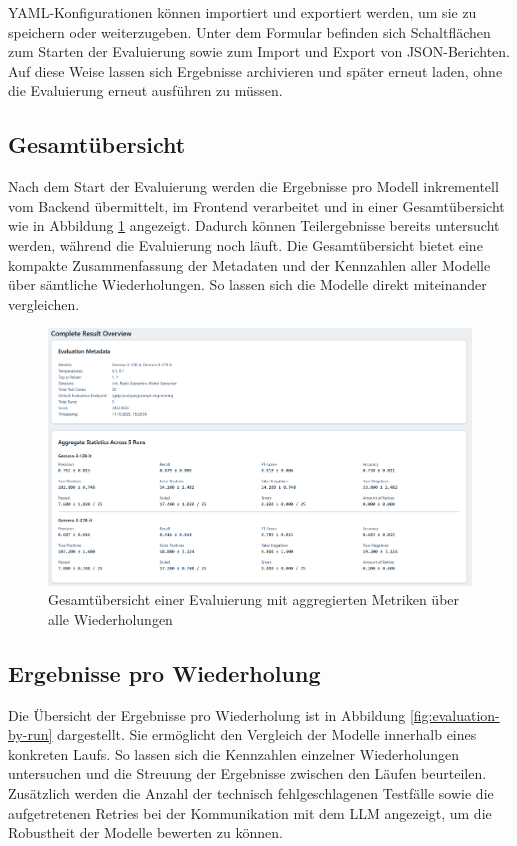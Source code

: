 YAML-Konfigurationen können importiert und exportiert werden, um sie zu speichern oder weiterzugeben. Unter dem Formular befinden sich Schaltflächen zum Starten der Evaluierung sowie zum Import und Export von JSON-Berichten. Auf diese Weise lassen sich Ergebnisse archivieren und später erneut laden, ohne die Evaluierung erneut ausführen zu müssen.

\subsection*{Gesamtübersicht}

Nach dem Start der Evaluierung werden die Ergebnisse pro Modell inkrementell vom Backend übermittelt, im Frontend verarbeitet und in einer Gesamtübersicht wie in Abbildung \ref{fig:evaluation-overview} angezeigt. Dadurch können Teilergebnisse bereits untersucht werden, während die Evaluierung noch läuft. Die Gesamtübersicht bietet eine kompakte Zusammenfassung der Metadaten und der Kennzahlen aller Modelle über sämtliche Wiederholungen. So lassen sich die Modelle direkt miteinander vergleichen.

\begin{figure}[h]
    \centering
    \includegraphics[width=\textwidth]{images/evaluation/evaluation-result-overview_new}
    \caption{Gesamtübersicht einer Evaluierung mit aggregierten Metriken über alle Wiederholungen}
    \label{fig:evaluation-overview}
\end{figure}

\subsection*{Ergebnisse pro Wiederholung}

Die Übersicht der Ergebnisse pro Wiederholung ist in Abbildung \ref{fig:evaluation-by-run} dargestellt. Sie ermöglicht den Vergleich der Modelle innerhalb eines konkreten Laufs. So lassen sich die Kennzahlen einzelner Wiederholungen untersuchen und die Streuung der Ergebnisse zwischen den Läufen beurteilen. Zusätzlich werden die Anzahl der technisch fehlgeschlagenen Testfälle sowie die aufgetretenen Retries bei der Kommunikation mit dem \ac{LLM} angezeigt, um die Robustheit der Modelle bewerten zu können.

